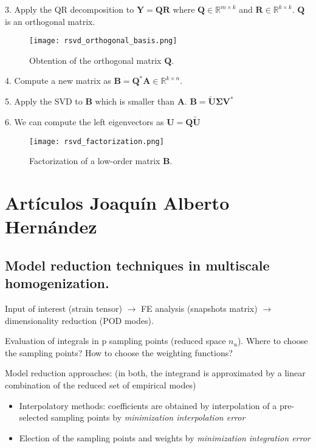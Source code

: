 \documentclass{article}
\begin{document}
3. Apply the QR decomposition to $\bm{Y} = \bm{Q} \bm{R}$ where $\bm{Q} \in \mathbb{R}^{m \times k}$ and $\bm{R} \in \mathbb{R}^{k \times k}$. $\bm{Q}$ is an orthogonal matrix. 

\begin{figure}[h!]
  \begin{center}
  \texttt{[image: rsvd\_orthogonal\_basis.png]}
  \caption{Obtention of the orthogonal matrix $\bm{Q}$.}
  \label{fig:rsvd_orthogonal_basis}
  \end{center}
\end{figure}

4. Compute a new matrix as $\bm{B} = \bm{Q}^*\bm{A} \in \mathbb{R}^{k \times n}$.

5. Apply the SVD to $\bm{B}$ which is smaller than $\bm{A}$. $\bm{B} = \bm{\tilde{U}}\bm{\Sigma}\bm{V}^*$

6. We can compute the left eigenvectors as $\bm{U} = \bm{Q}\bm{\tilde{U}}$

\begin{figure}[h!]
  \begin{center}
  \texttt{[image: rsvd\_factorization.png]}
  \caption{Factorization of a low-order matrix $\bm{B}$.}
  \label{fig:factorization}
  \end{center}
\end{figure}

\section{Artículos Joaquín Alberto Hernández}

\subsection{Model reduction techniques in multiscale homogenization. \cite{hernandez14}}
Input of interest (strain tensor) $\rightarrow$ FE analysis (snapshots matrix) $\rightarrow$ dimensionality reduction (POD modes).\newline

Evaluation of integrals in p sampling points (reduced space $n_u$). Where to choose the sampling points? How to choose the weighting functions? \newline

Model reduction approaches: (in both, the integrand is approximated by a linear combination of the reduced set of empirical modes)
\begin{itemize}
  \item Interpolatory methods: coefficients are obtained by interpolation of a pre-selected sampling points by \textit{minimization interpolation error}
  \item Election of the sampling points and weights by \textit{minimization integration error}
\end{itemize}
\end{document}
